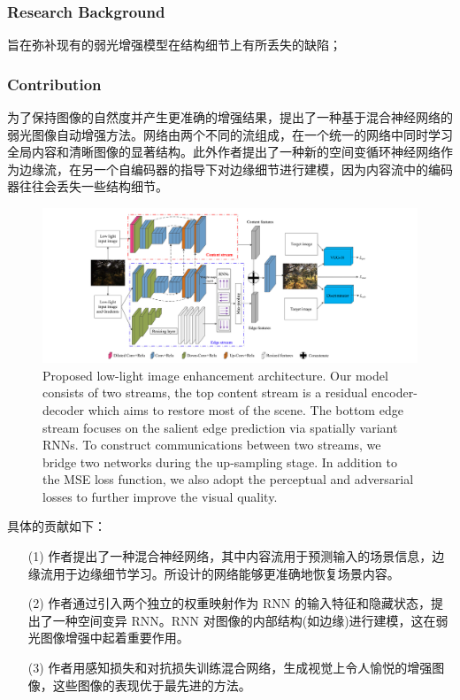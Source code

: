 \documentclass[a4paper]{ctexart}
\begin{document}
	\subsubsection{Research Background}
	
	旨在弥补现有的弱光增强模型在结构细节上有所丢失的缺陷；
	
	\subsubsection{Contribution}
	
	为了保持图像的自然度并产生更准确的增强结果，提出了一种基于混合神经网络的弱光图像自动增强方法。网络由两个不同的流组成，在一个统一的网络中同时学习全局内容和清晰图像的显著结构。此外作者提出了一种新的空间变循环神经网络作为边缘流，在另一个自编码器的指导下对边缘细节进行建模，因为内容流中的编码器往往会丢失一些结构细节。
	
	\begin{figure}[htbp]
		\centering 
		\includegraphics[width=\columnwidth]{picture/LLIE/DHN/Architecture}
		\caption{
			\label{fig: DHN Architecture} 
			Proposed low-light image enhancement architecture. Our model consists of two streams, the top content stream is a residual encoder-decoder which aims to restore most of the scene. The bottom edge stream focuses on the salient edge prediction via spatially variant RNNs. To construct communications between two streams, we bridge two networks during the up-sampling stage. In addition to the MSE loss function, we also adopt the perceptual and adversarial
			losses to further improve the visual quality.
		}
	\end{figure}
	
	具体的贡献如下：
	
	\begin{itemize}
		\item[(1)] 
		作者提出了一种混合神经网络，其中内容流用于预测输入的场景信息，边缘流用于边缘细节学习。所设计的网络能够更准确地恢复场景内容。
		
		\item[(2)]
		作者通过引入两个独立的权重映射作为 RNN 的输入特征和隐藏状态，提出了一种空间变异 RNN。RNN 对图像的内部结构(如边缘)进行建模，这在弱光图像增强中起着重要作用。
		
		\item[(3)]
		作者用感知损失和对抗损失训练混合网络，生成视觉上令人愉悦的增强图像，这些图像的表现优于最先进的方法。
	\end{itemize}	
	
\end{document}
